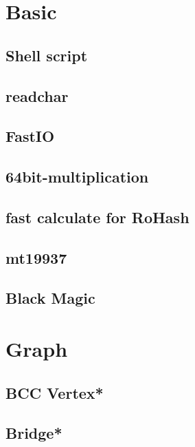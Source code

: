 \section{Basic}
\subsection{Shell script}

\subsection{readchar}

\subsection{FastIO}

\subsection{64bit-multiplication}

\subsection{fast calculate for RoHash}

\subsection{mt19937}

\subsection{Black Magic}

% 


\section{Graph}
\subsection{BCC Vertex*} %

\subsection{Bridge*} %

